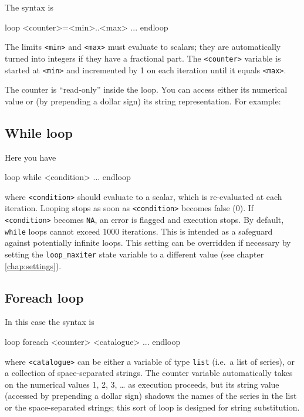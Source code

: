 The syntax is
\begin{code}
loop <counter>=<min>..<max>
   ...
endloop
\end{code}
The limits \texttt{<min>} and \texttt{<max>} must evaluate to scalars;
they are automatically turned into integers if they have a fractional
part. The \texttt{<counter>} variable is started at \texttt{<min>} and
incremented by 1 on each iteration until it equals \texttt{<max>}.

The counter is ``read-only'' inside the loop. You can access either
its numerical value or (by prepending a dollar sign) its string
representation. For example:

\subsection{While loop}

Here you have
\begin{code}
loop while <condition>
   ...
endloop
\end{code}
where \texttt{<condition>} should evaluate to a scalar, which is
re-evaluated at each iteration. Looping stops as soon as
\texttt{<condition>} becomes false (0). If \texttt{<condition>}
becomes \texttt{NA}, an error is flagged and execution stops.  By
default, \texttt{while} loops cannot exceed 1000 iterations. This is
intended as a safeguard against potentially infinite loops. This
setting can be overridden if necessary by setting the
\texttt{loop\_maxiter} state variable to a different value (see
chapter \ref{chap:settings}).

\subsection{Foreach loop}
\label{sec:loop-foreach}

In this case the syntax is
\begin{code}
loop foreach <counter> <catalogue>
   ...
endloop
\end{code}
where \texttt{<catalogue>} can be either a variable of type
\texttt{list} (i.e.\ a list of series), or a collection of
space-separated strings. The counter variable automatically takes on
the numerical values 1, 2, 3, \dots{} as execution proceeds, but its
string value (accessed by prepending a dollar sign) shadows the names
of the series in the list or the space-separated strings; this sort of
loop is designed for string substitution.


